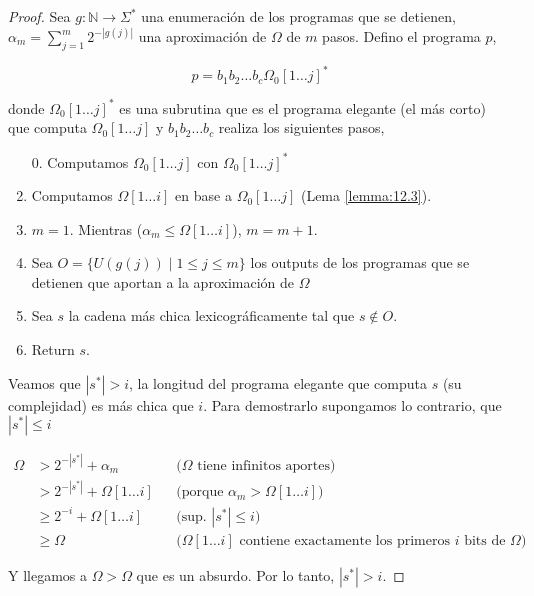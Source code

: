 \documentclass{article}
\theoremstyle{definition} %
\newcommand{\first}[2]{#2[1 \dots #1]}
\begin{document}
\begin{proof}
    Sea $g: \mathbb{N} \to \Sigma^*$ una enumeración de los programas que se
    detienen, $\alpha_m = \sum_{j = 1}^{m} 2 ^ {-|g(j)|}$ una aproximación de
    $\Omega$ de $m$ pasos. Defino el programa $p$,

    \[
        p = b_1 b_2 \dots b_c \first{j}{\Omega_0}^*
    \]

    donde $\first{j}{\Omega_0}^*$ es una subrutina que es el programa elegante
    (el más corto) que computa $\first{j}{\Omega_0}$ y $b_1 b_2 \dots b_c$
    realiza los siguientes pasos,

    \begin{enumerate}
        \item[0.] Computamos $\first{j}{\Omega_0}$ con
        $\first{j}{\Omega_0}^*$
        \item Computamos $\first{i}{\Omega}$ en base a
        $\first{j}{\Omega_0}$ (Lema \ref{lemma:12.3}).
        \item $m = 1$. Mientras ($\alpha_m \leq \first{i}{\Omega}$), $m = m + 1$.
        \item Sea $O = \{ U(g(j)) \mid 1 \leq j \leq m \}$ los outputs de los
        programas que se detienen que aportan a la aproximación de $\Omega$
        \item Sea $s$ la cadena más chica lexicográficamente tal que $s \notin O$.
        \item Return $s$.
    \end{enumerate}

    Veamos que $|s^*| > i$, la longitud del programa elegante que computa $s$
    (su complejidad) es más chica que $i$. Para demostrarlo supongamos lo
    contrario, que $|s^*| \leq i$

    \begin{align*}
        \Omega 
        &> 2^{-|s^*|} + \alpha_m
            &&\text{($\Omega$ tiene infinitos aportes)}\\
        &> 2^{-|s^*|} + \first{i}{\Omega}
            &&\text{(porque $\alpha_m > \first{i}{\Omega}$)}\\
        &\geq 2^{-i} + \first{i}{\Omega}
            &&\text{(sup. $|s^*| \leq i$)}\\
        &\geq \Omega
            &&\text{($\first{i}{\Omega}$ contiene exactamente los primeros $i$ bits de $\Omega$)}
    \end{align*}

    Y llegamos a $\Omega > \Omega$ que es un absurdo. Por lo tanto, $|s^*| > i$.
    

\end{proof}
\end{document}
